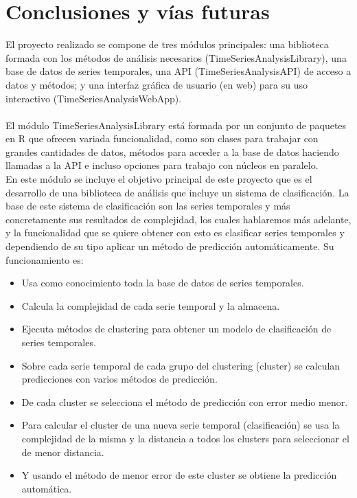\documentclass[14pt]{extarticle}
\theoremstyle{definition}
\theoremstyle{remark}
\begin{document}
\section{Conclusiones y vías futuras}\label{sec:conclusionesyviasfuturas}
El proyecto realizado se compone de tres módulos principales: una biblioteca formada con los métodos de análisis necesarios (TimeSeriesAnalysisLibrary), una base de datos de series temporales, una API (TimeSeriesAnalysisAPI) de acceso a datos y métodos; y una interfaz gráfica de usuario (en web) para su uso interactivo (TimeSeriesAnalysisWebApp).\\\\
El módulo TimeSeriesAnalysisLibrary está formada por un conjunto de paquetes en R que ofrecen variada funcionalidad, como son clases para trabajar con grandes cantidades de datos, métodos para acceder a la base de datos haciendo llamadas a la API e incluso opciones para trabajo con núcleos en paralelo. \\En este módulo se incluye el objetivo principal de este proyecto que es el desarrollo de una biblioteca de análisis que incluye un sistema de clasificación. La base de este sistema de clasificación son las series temporales y más concretamente sus resultados de complejidad, los cuales hablaremos más adelante, y la funcionalidad que se quiere obtener con esto es clasificar series temporales y dependiendo de su tipo aplicar un método de predicción automáticamente. Su funcionamiento es: \\
\begin{itemize}
	\item Usa como conocimiento toda la base de datos de series temporales.
	\item Calcula la complejidad de cada serie temporal y la almacena.
	\item Ejecuta métodos de clustering para obtener un modelo de clasificación de series temporales.
	\item Sobre cada serie temporal de cada grupo del clustering (cluster) se calculan predicciones con varios métodos de predicción.
	\item De cada cluster se selecciona el método de predicción con error medio menor.
	\item Para calcular el cluster de una nueva serie temporal (clasificación) se usa la complejidad de la misma y la distancia a todos los clusters para seleccionar el de menor distancia.
	\item Y usando el método de menor error de este cluster se obtiene la predicción automática.
\end{itemize}
\end{document}
